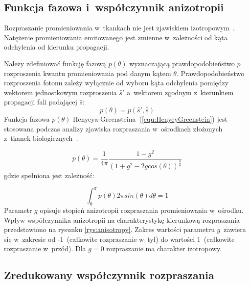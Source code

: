 \subsection{Funkcja fazowa i~współczynnik anizotropii}
\label{subsec:PhaseAnisotropy}

Rozpraszanie promieniowania w~tkankach nie jest zjawiskiem izotropowym~\cite{Yavari:PhD:2006}. Natężenie promieniowania emitowanego jest zmienne w~zależności 
od kąta odchylenia od kierunku propagacji.

Należy zdefiniować funkcję fazową $p(\theta)$ wyznaczającą prawdopodobieństwo $p$ rozproszenia kwantu promieniowania pod danym kątem $\theta$. Prawdopodobieństwo 
rozproszenia fotonu zależy wyłącznie od wyboru kąta odchylenia pomiędzy wektorem jednostkowym rozproszenia $\hat{s}'$ a~wektorem zgodnym z~kierunkiem propagacji fali 
padającej $\hat{s}$:
\begin{equation}
	p(\theta)=p(\hat{s}', \hat{s})
\end{equation}
Funkcja fazowa $p(\theta)$ Henyeya-Greensteina~(\ref{equ:HenyeyGreenstein}) jest stosowana podczas analizy zjawiska rozpraszania w~ośrodkach złożonych z~tkanek 
biologicznych~\cite{Yavari:PhD:2006}. 

\begin{equation}
	p(\theta)=\frac{1}{4\pi}\frac{1-g^2}{(1+g^2-2gcos(\theta))^{\frac{3}{2}}}
	\label{equ:HenyeyGreenstein}
\end{equation}
gdzie spełniona jest zależność:

\begin{equation}
	\int_{0}^{\pi} p(\theta)2\pi sin(\theta)d\theta=1
\end{equation}
Parametr $g$ opisuje stopień anizotropii rozpraszania promieniowania w~ośrodku.
Wpływ współczynnika anizotropii na charakterystykę kierunkową rozpraszania przedstawiono na rysunku \ref{rys:anisotropy}. Zakres 
wartości parametru $g$~zawiera się w~zakresie od -1~(całkowite rozpraszanie w~tył) do wartości 1~(całkowite rozpraszanie w~przód).
Dla $g=0$ rozpraszanie ma charakter izotropowy. 

\subsection{Zredukowany współczynnik rozpraszania}
\label{subsec:ReducedFactor}

